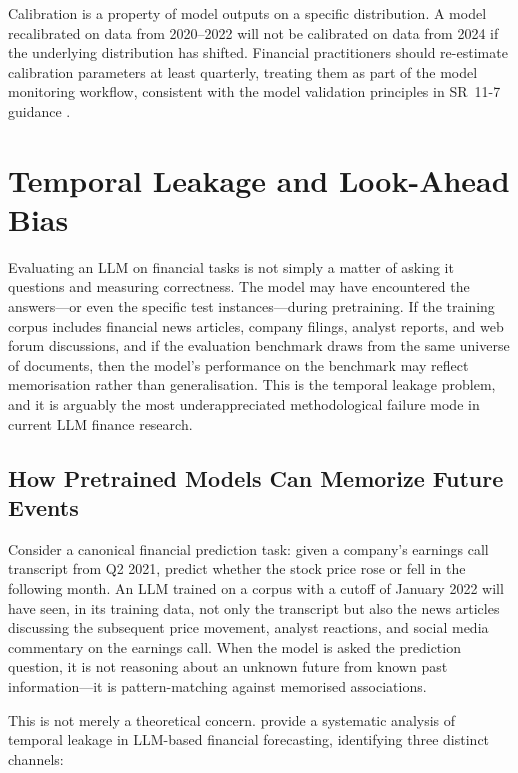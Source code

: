 \begin{remark}
Calibration is a property of model outputs on a specific distribution. A model
recalibrated on data from 2020--2022 will not be calibrated on data from 2024 if the
underlying distribution has shifted. Financial practitioners should re-estimate
calibration parameters at least quarterly, treating them as part of the model monitoring
workflow, consistent with the model validation principles in SR~11-7 guidance \cite{sr117}.
\end{remark}

\section{Temporal Leakage and Look-Ahead Bias}
\label{sec:ch13-temporal-leakage}

Evaluating an LLM on financial tasks is not simply a matter of asking it questions and
measuring correctness. The model may have encountered the answers---or even the specific
test instances---during pretraining. If the training corpus includes financial news
articles, company filings, analyst reports, and web forum discussions, and if the
evaluation benchmark draws from the same universe of documents, then the model's
performance on the benchmark may reflect memorisation rather than generalisation. This
is the temporal leakage problem, and it is arguably the most underappreciated
methodological failure mode in current LLM finance research.

\subsection{How Pretrained Models Can Memorize Future Events}
\label{sec:ch13-memorize-future-events}

Consider a canonical financial prediction task: given a company's earnings call
transcript from Q2 2021, predict whether the stock price rose or fell in the following
month. An LLM trained on a corpus with a cutoff of January 2022 will have seen, in its
training data, not only the transcript but also the news articles discussing the
subsequent price movement, analyst reactions, and social media commentary on the
earnings call. When the model is asked the prediction question, it is not reasoning
about an unknown future from known past information---it is pattern-matching against
memorised associations.

This is not merely a theoretical concern. \citet{ziemke2024temporal} provide a
systematic analysis of temporal leakage in LLM-based financial forecasting, identifying
three distinct channels:

